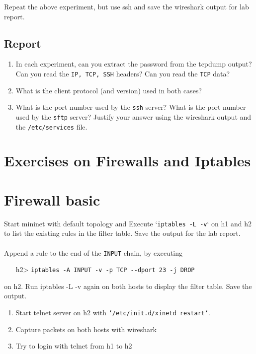 \documentclass[10pt,a4paper]{article}
\numberwithin{equation}{section}
\numberwithin{figure}{section}
\numberwithin{table}{section}
\begin{document}
	Repeat the above experiment, but use ssh and save the wireshark output for lab report.
	
	\subsection*{Report}
	\begin{enumerate}
		\setlength{\itemindent}{0pt}
		\item In each experiment, can you extract the password from the tcpdump output? Can you read the \texttt{IP, TCP, SSH} headers? Can you read the \texttt{TCP} data?
		\item What is the client protocol (and version) used in both cases?
		\item What is the port number used by the \texttt{ssh} server? What is the port number used by the \texttt{sftp} server? Justify your answer using the wireshark output and the \texttt{/etc/services} file.
	\end{enumerate}
	
	
	\section*{Exercises on Firewalls and Iptables}
	\section{Firewall basic}
	Start mininet with default topology and Execute `\texttt{iptables -L -v}` on h1 and h2 to list the existing rules in the filter table. Save the output for the lab report.\\
	\\
	Append a rule to the end of the \texttt{INPUT} chain, by executing
	
	\begin{itemize}
		\setlength{\itemindent}{10pt}
		\item [h2>] \texttt{iptables -A INPUT -v -p TCP -{}-dport 23 -j DROP} 
	\end{itemize}
	
	\setlength{\parindent}{0pt}
	on h2. Run iptables -L -v again on both hosts to display the filter table. Save the output.\\
	
	
	\begin{enumerate}
		\setlength{\itemindent}{0pt}
		\item Start telnet server on h2 with \texttt{`/etc/init.d/xinetd restart`}.
		\item Capture packets on both hosts with wireshark
		\item Try to login with telnet from h1 to h2
	\end{enumerate}
	
\end{document}
